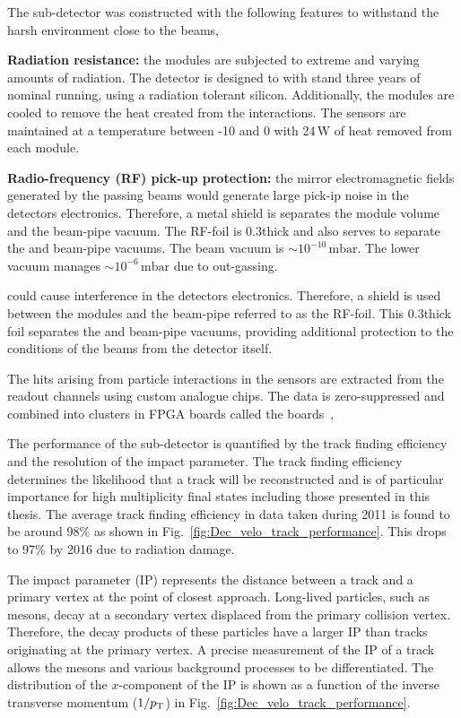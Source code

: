 The \velo sub-detector was constructed with the following features to withstand the harsh environment close to the \lhc beams,
\begin{description}   
\item \textbf{Radiation resistance:} the \velo modules are subjected to extreme and varying amounts of radiation. The detector is designed to with stand three years of nominal \lhc running, using a radiation tolerant silicon. Additionally, the \velo modules are cooled to remove the heat created from the interactions. The sensors are maintained at a temperature between -10 and 0 with 24\,W of heat removed from each module.  
\item \textbf{Radio-frequency (RF) pick-up protection:} the mirror electromagnetic fields generated by the passing \lhc beams would generate large pick-ip noise in the \velo detectors electronics. Therefore, a metal shield is separates the module volume and the beam-pipe vacuum. The RF-foil is 0.3\mm thick and also serves to separate the \velo and beam-pipe vacuums. The beam vacuum is $\sim 10^{-10}\,\text{mbar}$. The lower \velo vacuum manages $\sim 10^{-6}\,\text{mbar}$ due to out-gassing.

could cause interference in the \velo detectors electronics. Therefore, a shield is used between the modules and the beam-pipe referred to as the RF-foil. This 0.3\mm thick foil separates the \velo and beam-pipe vacuums, providing additional protection to the conditions of the beams from the \velo detector itself.
\end{description}   

The hits arising from particle interactions in the \velo sensors are extracted from the readout channels using custom analogue chips. The data is zero-suppressed and combined into clusters in FPGA boards called the \tellone boards~\cite{HAEFELI2006494}, 


The performance of the \velo sub-detector is quantified by the track finding efficiency and the resolution of the impact parameter. 
The track finding efficiency determines the likelihood that a track will be reconstructed and is of particular importance for high multiplicity final states including those presented in this thesis. The average track finding efficiency in data taken during 2011 is found to be around 98\% as shown in Fig.~\ref{fig:Dec_velo_track_performance}. This drops to 97\% by 2016 due to radiation damage.

The impact parameter (IP) represents the distance between a track and a primary vertex at the point of closest approach. Long-lived particles, such as \Bp mesons, decay at a secondary vertex displaced from the primary collision vertex. Therefore, the decay products of these particles have a larger IP than tracks originating at the primary vertex. A precise measurement of the IP of a track allows the \Bp mesons and various background processes to be differentiated. The distribution of the $x$-component of the IP is shown as a function of the inverse transverse momentum ($1/\mbox{$p_{\mathrm{ T}}$}$) in Fig.~\ref{fig:Dec_velo_track_performance}.  

